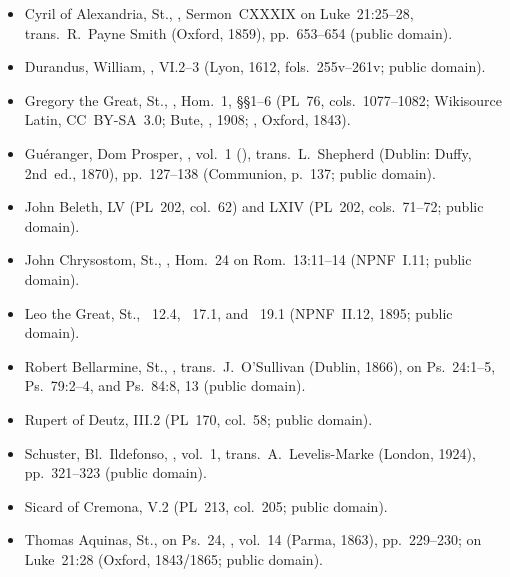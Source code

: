 {\begin{itemize}[itemsep=0pt,parsep=1pt,topsep=0.15em]
\item Cyril of Alexandria, St., , Sermon~CXXXIX on Luke~21:25--28, trans.\ R.~Payne Smith (Oxford, 1859), pp.~653--654 (public domain).
\item Durandus, William, , VI.2--3 (Lyon, 1612, fols.~255v--261v; public domain).
\item Gregory the Great, St., , Hom.~1, \S\S1--6 (PL~76, cols.~1077--1082; Wikisource Latin, CC~BY-SA~3.0; Bute, , 1908; , Oxford, 1843).
\item Gu\'eranger, Dom Prosper, , vol.~1 (), trans.\ L.~Shepherd (Dublin: Duffy, 2nd~ed., 1870), pp.~127--138 (Communion, p.~137; public domain).
\item John Beleth,  LV (PL~202, col.~62) and LXIV (PL~202, cols.~71--72; public domain).
\item John Chrysostom, St., , Hom.~24 on Rom.~13:11--14 (NPNF~I.11; public domain).
\item Leo the Great, St., ~12.4, ~17.1, and ~19.1 (NPNF~II.12, 1895; public domain).
\item Robert Bellarmine, St., , trans.\ J.~O'Sullivan (Dublin, 1866), on Ps.~24:1--5, Ps.~79:2--4, and Ps.~84:8, 13 (public domain).
\item Rupert of Deutz,  III.2 (PL~170, col.~58; public domain).
\item Schuster, Bl.~Ildefonso, , vol.~1, trans.\ A.~Levelis-Marke (London, 1924), pp.~321--323 (public domain).
\item Sicard of Cremona,  V.2 (PL~213, col.~205; public domain).
\item Thomas Aquinas, St.,  on Ps.~24, , vol.~14 (Parma, 1863), pp.~229--230;  on Luke~21:28 (Oxford, 1843/1865; public domain).
\end{itemize}
}
